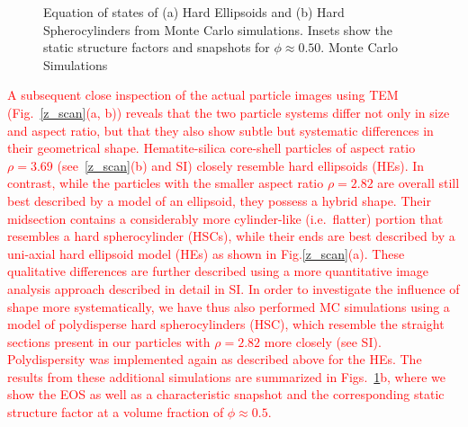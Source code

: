 \documentclass[aps,prl,preprint,superscriptaddress]{revtex4-1} %
\begin{document}
\begin{figure}[h]
\caption{Equation of states of (a) Hard Ellipsoids and (b) Hard Spherocylinders from Monte Carlo simulations. 
  Insets show the static structure factors and snapshots for $\phi\approx 0.50$. 
Monte Carlo Simulations}\label{fig:sim}
\end{figure}



\textcolor{red}{A subsequent close inspection of the actual particle images using TEM (Fig.~\ref{z_scan}(a, b)) reveals that the two particle systems differ not only in size and aspect ratio, but that they also show subtle but systematic differences in their geometrical shape. Hematite-silica core-shell particles of aspect ratio $\rho=3.69$  (see~\ref{z_scan}(b) and SI)
closely resemble hard ellipsoids (HEs). In contrast, while the particles with the smaller aspect ratio $\rho=2.82$ are overall still best described by a model of an ellipsoid, they possess a  
hybrid shape. Their midsection contains a considerably more cylinder-like (i.e.~flatter) portion that resembles a hard spherocylinder (HSCs), 
while their ends are best described by a uni-axial hard ellipsoid model (HEs) as shown in Fig.\ref{z_scan}(a). These qualitative differences are further described using a more quantitative image analysis approach described in detail in SI. In order to investigate the influence of shape more systematically, we have thus also performed MC simulations using a model of polydisperse hard spherocylinders (HSC), which resemble the straight sections present in our particles with $\rho=2.82$ more closely (see SI). Polydispersity was implemented again as described above for the HEs. The results from these additional simulations are summarized in Figs.~\ref{fig:sim}b, where we show the EOS as well as a characteristic snapshot and the corresponding static structure factor at a volume fraction of $\phi \approx 0.5$.}
\end{document}
